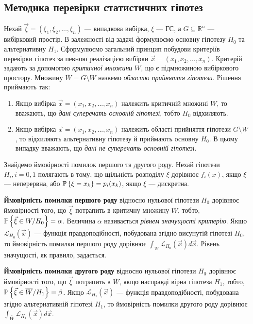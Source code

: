 \subsection{Методика перевірки статистичних гіпотез}
Нехай $\vec{\xi} = \left(\xi_1, \xi_2 ,..., \xi_n\right)$ --- випадкова вибірка, $\xi$ --- ГС, а $G\subseteq \mathbb{R}^n$ --- вибірковий простір.
В залежності від задачі формулюємо основну гіпотезу $H_0$ та альтернативну $H_1$. Сформулюємо загальний принцип побудови 
критеріїв перевірки гіпотез за певною реалізацією вибірки $\vec{x} = \left(x_1, x_2, ..., x_n\right)$.
Критерій задають за допомогою \emph{критичної множини} $W$, що є підмножиною вибіркового простору.
Множину $\overline{W} = G\setminus W$ назвемо \emph{областю прийняття гіпотези}. Рішення приймають так:
\begin{enumerate}
    \item Якщо вибірка $\vec{x} = \left(x_1, x_2, ..., x_n\right)$ належить критичній множині $W$, то вважають, що \emph{дані суперечать основній гіпотезі}, тобто $H_0$ відхиляють.
    \item Якщо вибірка $\vec{x} = \left(x_1, x_2, ..., x_n\right)$ належить області прийняття гіпотези $G\setminus W$, то відхиляють альтернативну гіпотезу й приймають основну $H_0$. В цьому
    випадку вважають, що \emph{дані не суперечать основній гіпотезі}.
\end{enumerate}

Знайдемо ймовірності помилок першого та другого роду. Нехай гіпотези $H_i, i = 0, 1$ полягають в тому, що щільність розподілу $\xi$ дорівнює $f_i(x)$,
якщо $\xi$ --- неперервна, або $\P\left\{ \xi = x_k\right\} = p_i(x_k)$, якщо $\xi$ --- дискретна.

\textbf{Ймовірність помилки першого роду} відносно нульової гіпотези $H_0$ дорівнює ймовірності того, що $\vec{\xi}$ потрапить в критичну множину $W$, тобто,
$\P\left\{ \vec{\xi} \in W / H_0\right\} = \alpha$. Величина $\alpha$ називається \emph{рівнем значущості критерію}. Якщо 
$\mathcal{L}_{H_0}(\vec{x})$ --- функція правдоподібності, побудована згідно висунутій гіпотезі $H_0$, то ймовірність помилки першого роду дорівнює
$\int_W \mathcal{L}_{H_0}(\vec{x}) d\vec{x}$. Рівень значущості, як правило, задається.

\textbf{Ймовірність помилки другого роду} відносно нульової гіпотези $H_0$ дорівнює ймовірності того, що $\vec{\xi}$ потрапить в $\overline{W}$,
якщо насправді вірна гіпотеза $H_1$, тобто, $\P\left\{ \vec{\xi} \in \overline{W} / H_1\right\} = \beta$. Якщо 
$\mathcal{L}_{H_1}(\vec{x})$ --- функція правдоподібності, побудована згідно альтернативній гіпотезі $H_1$, то ймовірність помилки другого роду дорівнює
$\int_{\overline{W}} \mathcal{L}_{H_1}(\vec{x}) d\vec{x}$.

